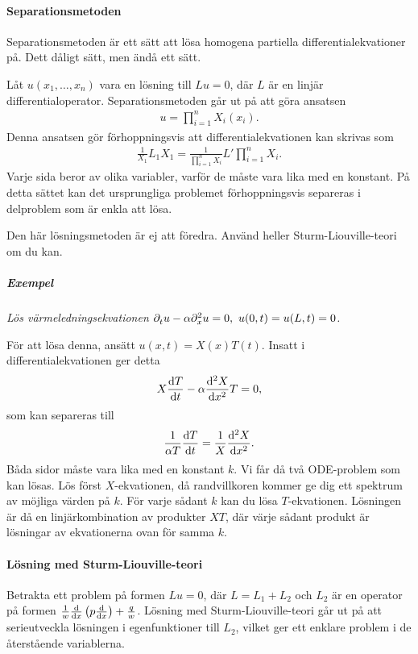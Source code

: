 \paragraph{Separationsmetoden}
Separationsmetoden är ett sätt att lösa homogena partiella differentialekvationer på. Dett dåligt sätt, men ändå ett sätt.

Låt $u(x_{1}, \dots, x_{n})$ vara en lösning till $Lu = 0$, där $L$ är en linjär differentialoperator. Separationsmetoden går ut på att göra ansatsen
\begin{align*}
	u = \prod\limits_{i = 1}^{n}X_{i}(x_{i}).
\end{align*}
Denna ansatsen gör förhoppningsvis att differentialekvationen kan skrivas som
\begin{align*}
	\frac{1}{X_{1}}L_{1}X_{1} = \frac{1}{\prod\limits_{i = 1}^{n}X_{i}}L'\prod\limits_{i = 1}^{n}X_{i}.
\end{align*}
Varje sida beror av olika variabler, varför de måste vara lika med en konstant. På detta sättet kan det ursprungliga problemet förhoppningsvis separeras i delproblem som är enkla att lösa.

Den här lösningsmetoden är ej att föredra. Använd heller Sturm-Liouville-teori om du kan.

\subparagraph{Exempel}
\textit{
Lös värmeledningsekvationen $\del{t}u - \alpha\del[2]{x}u = 0,\ u(0, t) = u(L, t) = 0$.
}

För att lösa denna, ansätt $u(x, t) = X(x)T(t)$. Insatt i differentialekvationen ger detta
\begin{align*}
	X\dv{T}{t} - \alpha\dv[2]{X}{x}T = 0,
\end{align*}
som kan separeras till
\begin{align*}
	\frac{1}{\alpha T}\dv{T}{t} = \frac{1}{X}\dv[2]{X}{x}.
\end{align*}
Båda sidor måste vara lika med en konstant $k$. Vi får då två ODE-problem som kan lösas. Lös först $X$-ekvationen, då randvillkoren kommer ge dig ett spektrum av möjliga värden på $k$. För varje sådant $k$ kan du lösa $T$-ekvationen. Lösningen är då en linjärkombination av produkter $XT$, där värje sådant produkt är lösningar av ekvationerna ovan för samma $k$.

\paragraph{Lösning med Sturm-Liouville-teori}
Betrakta ett problem på formen $Lu = 0$, där $L = L_{1} + L_{2}$ och $L_{2}$ är en operator på formen $\frac{1}{w}\dv{x}\left(p\dv{x}\right) + \frac{q}{w}$. Lösning med Sturm-Liouville-teori går ut på att serieutveckla lösningen i egenfunktioner till $L_{2}$, vilket ger ett enklare problem i de återstående variablerna.

